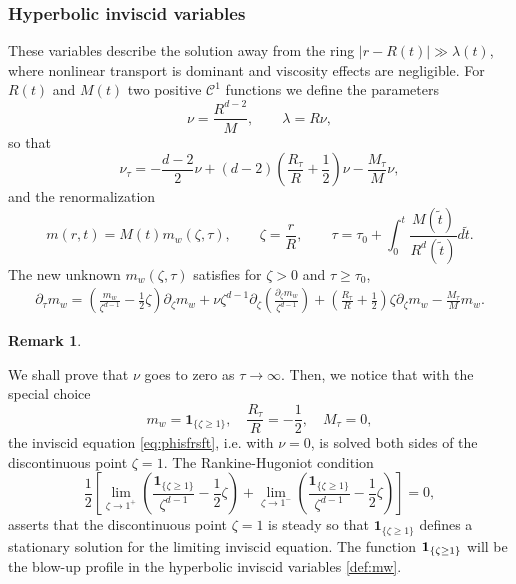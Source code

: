 \documentclass[11pt]{aims}
\theoremstyle{definition}
\newtheorem{remark}[theorem]{Remark}
\newcommand{\pa}{\partial}
\newcommand{\be}{\begin{equation}}
\newcommand{\ee}{\end{equation}}
\numberwithin{equation}{section}
\begin{document}
\subsubsection{Hyperbolic inviscid variables} These variables describe the solution away from the ring $|r-R(t)|\gg \lambda(t)$, where nonlinear transport is dominant and viscosity effects are negligible. For $R(t)$ and $M(t)$ two positive $\mathcal{C}^1$ functions we define the parameters
\begin{equation}\label{eq:relRMnu}
\nu = \frac{R^{d-2}}{M}, \qquad \lambda=R\nu,
\end{equation}
so that
$$
\nu_\tau=-\frac{d-2}{2}\nu+(d-2)\left(\frac{R_\tau}{R}+\frac 12 \right)\nu-\frac{M_\tau}{M}\nu,
$$
and the renormalization
\begin{equation} \label{def:mw}
m(r,t) = M(t)m_w(\zeta, \tau), \qquad \zeta=\frac{r}{R}, \qquad \tau=\tau_0+\int_0^t \frac{M(\tilde t)}{R^d(\tilde t)}d\tilde t.
\end{equation}
The new unknown $m_w(\zeta,\tau)$ satisfies for $\zeta> 0$ and $\tau \geq \tau_0$,
\begin{align}
\partial_\tau m_w =  \left(\frac{m_w}{\zeta^{d-1}}-\frac{1}{2}\zeta\right) \pa_\zeta m_w +   \nu \zeta^{d-1}\pa_\zeta \left( \frac{\pa_\zeta m_w}{\zeta^{d-1}} \right) + \left(\frac{R_\tau}{R}+\frac 12 \right)\zeta \pa_\zeta m_w -\frac{M_\tau}{M}m_w. \label{eq:phisfrsft}
\end{align}

\begin{remark} \label{re:shock}

We shall prove that $\nu$ goes to zero as $\tau \to \infty$. Then, we notice that with the special choice
$$m_w = \mathbf{1}_{\{\zeta \geq 1\}}, \quad \frac{R_\tau}{R} = -\frac{1}{2}, \quad M_\tau = 0,$$
the inviscid equation \eqref{eq:phisfrsft}, i.e. with $\nu = 0$, is solved both sides of the discontinuous point $\zeta = 1$. The Rankine-Hugoniot condition
\be \label{id:rankinehugoniot}
\frac{1}{2}\left[\lim_{\zeta \to 1^+} \left( \frac{\mathbf{1}_{\{\zeta \geq 1\}}}{\zeta^{d-1}} - \frac{1}{2}\zeta   \right) + \lim_{\zeta \to 1^-} \left( \frac{\mathbf{1}_{\{\zeta \geq 1\}}}{\zeta^{d-1}} - \frac{1}{2}\zeta   \right) \right] = 0,
\ee
asserts that the discontinuous point $\zeta = 1$ is steady so that $\mathbf{1}_{\{\zeta \geq 1\}}$ defines a stationary solution for the limiting inviscid equation. The function ${\bf 1}_{\{\zeta \geq 1\}}$ will be the blow-up profile in the hyperbolic inviscid variables \eqref{def:mw}.

\end{remark}
\end{document}
